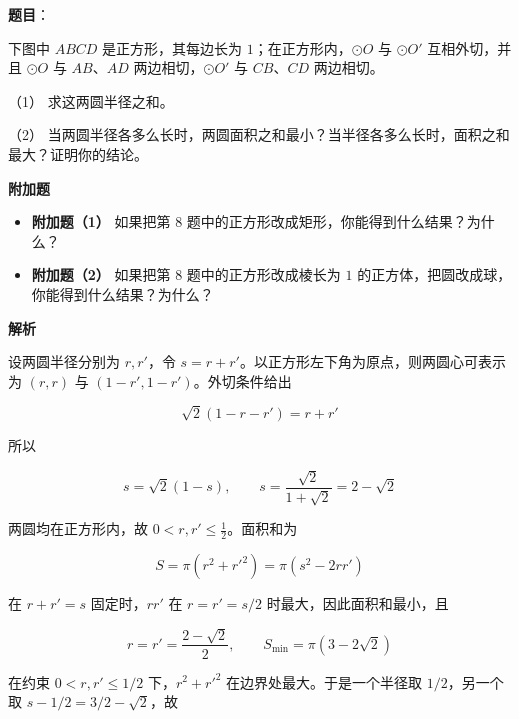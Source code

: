 \begin{answer}

\textbf{题目}：

下图中 $ABCD$ 是正方形，其每边长为 $1$；在正方形内，$\odot O$ 与 $\odot O'$ 互相外切，并且 $\odot O$ 与 $AB$、$AD$ 两边相切，$\odot O'$ 与 $CB$、$CD$ 两边相切。
\nopagebreak[4]
\begin{center}\end{center}
\nopagebreak[4]
（1） 求这两圆半径之和。

（2） 当两圆半径各多么长时，两圆面积之和最小？当半径各多么长时，面积之和最大？证明你的结论。

\Needspace{0.25\textheight}
\textbf{附加题}

\begin{itemize}
\item \textbf{附加题（1）} 如果把第 8 题中的正方形改成矩形，你能得到什么结果？为什么？
\end{itemize}

\begin{itemize}
\item \textbf{附加题（2）} 如果把第 8 题中的正方形改成棱长为 $1$ 的正方体，把圆改成球，你能得到什么结果？为什么？
\end{itemize}

\textbf{解析}


设两圆半径分别为 $r,r'$，令 $s=r+r'$。以正方形左下角为原点，则两圆心可表示为 $(r,r)$ 与 $(1-r',1-r')$。外切条件给出

\nopagebreak[4]
\[\sqrt2(1-r-r')=r+r'\]

所以

\nopagebreak[4]
\[s=\sqrt2(1-s),\qquad s=\frac{\sqrt2}{1+\sqrt2}=2-\sqrt2\]


两圆均在正方形内，故 $0<r,r'\leqslant\frac12$。面积和为

\nopagebreak[4]
\[S=\pi(r^2+r'^2)=\pi(s^2-2rr')\]

在 $r+r'=s$ 固定时，$rr'$ 在 $r=r'=s/2$ 时最大，因此面积和最小，且

\nopagebreak[4]
\[r=r'=\frac{2-\sqrt2}{2},\qquad S_{\min}=\pi(3-2\sqrt2)\]

在约束 $0<r,r'\leqslant1/2$ 下，$r^2+r'^2$ 在边界处最大。于是一个半径取 $1/2$，另一个取 $s-1/2=3/2-\sqrt2$，故


\end{answer}
